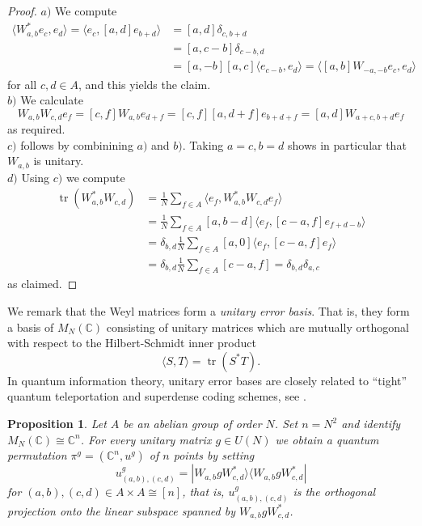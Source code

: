 \documentclass[a4paper]{amsart}
\newcommand*{\ket}{\rangle}
\newcommand*{\bra}{\langle}
\DeclareMathOperator{\tr}{tr}
\numberwithin{equation}{section}
\theoremstyle{change}
\newtheorem{prop}[theorem]{Proposition}
\begin{document}
\begin{proof} 
$ a) $ We compute 
\begin{align*}
\bra W_{a,b}^* e_c, e_d \ket = \bra e_c, [a,d] e_{b + d} \ket &= [a,d] \delta_{c, b + d} \\
&= [a, c - b] \delta_{c - b, d} \\ 
&= [a, -b] [a, c] \bra e_{c - b}, e_d \ket = \bra [a,b] W_{-a,-b} e_c, e_d \ket 
\end{align*}
for all $ c,d \in A $, and this yields the claim. \\ 
$ b) $ We calculate 
$$
W_{a,b} W_{c,d} e_f = [c, f] W_{a,b} e_{d + f} = [c, f] [a, d + f] e_{b + d + f} = [a,d] W_{a + c, b + d} e_f 
$$
as required. \\
$ c) $ follows by combinining $ a) $ and $ b) $. Taking $ a = c, b = d $ shows in particular that $ W_{a,b} $ is unitary. \\
$ d) $ Using $ c) $ we compute 
\begin{align*}
\tr(W_{a,b}^* W_{c,d}) &= \frac{1}{N} \sum_{f \in A} \bra e_f, W_{a,b}^* W_{c,d} e_f \ket \\
&= \frac{1}{N} \sum_{f \in A} [a, b - d] \bra e_f, [c - a, f] e_{f + d - b} \ket \\
&= \delta_{b,d} \frac{1}{N} \sum_{f \in A} [a, 0] \bra e_f, [c - a, f] e_f \ket \\
&= \delta_{b,d} \frac{1}{N} \sum_{f \in A} [c - a, f] = \delta_{b,d} \delta_{a,c} 
\end{align*}
as claimed. 
\end{proof} 

We remark that the Weyl matrices form a \emph{unitary error basis}. That is, they form a basis of $ M_N(\mathbb{C}) $ consisting of unitary matrices which 
are mutually orthogonal with respect to the Hilbert-Schmidt inner product 
$$
\bra S,T \ket = \tr(S^* T).  
$$
In quantum information theory, unitary error bases are closely related to ``tight'' quantum teleportation and superdense coding schemes, see \cite{WERNER_teleportation}. 

\begin{prop} \label{weylquantumpermutation}
Let $ A $ be an abelian group of order $ N $. Set $ n = N^2 $ and identify $ M_N(\mathbb{C}) \cong \mathbb{C}^n $. For every unitary matrix $ g \in U(N) $ we obtain a quantum permutation $ \pi^g = (\mathbb{C}^n, u^g) $ of $ n $ points by setting 
$$
u^g_{(a,b),(c,d)} = |W_{a,b} g W_{c,d}^* \ket \bra W_{a,b} g W_{c,d}^*| 
$$
for $ (a,b), (c,d) \in A \times A \cong [n] $, that is, $ u^g_{(a,b),(c,d)} $ is the orthogonal projection onto the linear subspace spanned by $ W_{a,b} g W_{c,d}^* $. 
\end{prop} 
\end{document}
